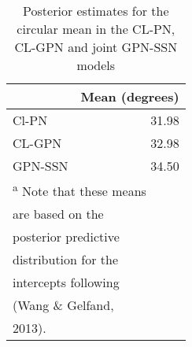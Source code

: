 \documentclass[11pt,]{article}
\begin{document}
\begin{table}

\caption{\label{tab:means}Posterior estimates for the circular mean in the CL-PN, CL-GPN and joint GPN-SSN models}
\centering
\begin{tabular}[t]{lr}
\toprule
  & Mean (degrees)\\
\midrule
Cl-PN & 31.98\\
CL-GPN & 32.98\\
GPN-SSN & 34.50\\
\bottomrule
\multicolumn{2}{l}{\textsuperscript{a} Note that these means}\\
\multicolumn{2}{l}{are based on the}\\
\multicolumn{2}{l}{posterior predictive}\\
\multicolumn{2}{l}{distribution for the}\\
\multicolumn{2}{l}{intercepts following}\\
\multicolumn{2}{l}{(Wang \& Gelfand,}\\
\multicolumn{2}{l}{2013).}\\
\end{tabular}
\end{table}
\end{document}
